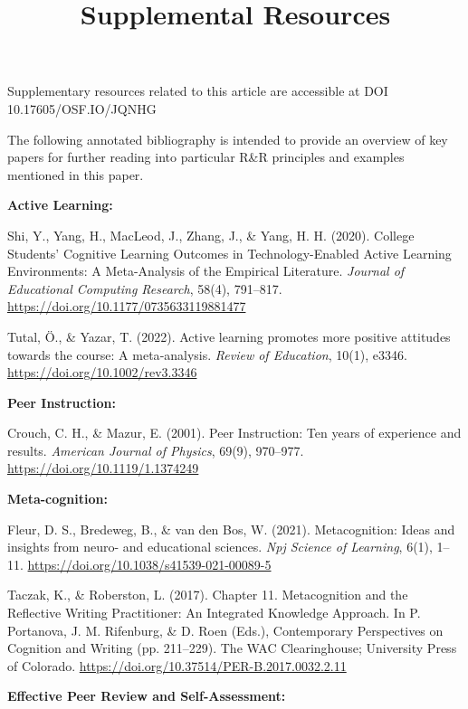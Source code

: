 \documentclass[11pt]{article}
\begin{document}
\title{Supplemental Resources}
\maketitle

Supplementary resources related to this article are accessible at DOI 10.17605/OSF.IO/JQNHG \cite{LaCombe_Lavin_Horton_Ball_Holler_2025}

The following annotated bibliography is intended to provide an overview of key papers for further reading into particular R\&R principles and examples mentioned in this paper.

\vspace{.1in}
\noindent
{\bf Active Learning:}

Shi, Y., Yang, H., MacLeod, J., Zhang, J., \& Yang, H. H. (2020). College Students’ Cognitive Learning Outcomes in Technology-Enabled Active Learning Environments: A Meta-Analysis of the Empirical Literature. \emph{Journal of Educational Computing Research}, 58(4), 791–817. \url{https://doi.org/10.1177/0735633119881477}

Tutal, {\"O}., \& Yazar, T. (2022). Active learning promotes more positive attitudes towards the course: A meta‐analysis. \emph{Review of Education}, 10(1), e3346. \url{https://doi.org/10.1002/rev3.3346}

\vspace{.1in}
\noindent
{\bf Peer Instruction:} 

Crouch, C. H., \& Mazur, E. (2001). Peer Instruction: Ten years of experience and results. \emph{American Journal of Physics}, 69(9), 970–977. \url{https://doi.org/10.1119/1.1374249}

\vspace{.1in}
\noindent
{\bf Meta-cognition:}

Fleur, D. S., Bredeweg, B., \& van den Bos, W. (2021). Metacognition: Ideas and insights from neuro- and educational sciences. \emph{Npj Science of Learning}, 6(1), 1–11. \url{https://doi.org/10.1038/s41539-021-00089-5}

Taczak, K., \& Roberston, L. (2017). Chapter 11. Metacognition and the Reflective Writing Practitioner: An Integrated Knowledge Approach. In P. Portanova, J. M. Rifenburg, \& D. Roen (Eds.), Contemporary Perspectives on Cognition and Writing (pp. 211–229). The WAC Clearinghouse; University Press of Colorado. \url{https://doi.org/10.37514/PER-B.2017.0032.2.11}

\vspace{.1in}
\noindent
{\bf Effective Peer Review and Self-Assessment:}
\end{document}
